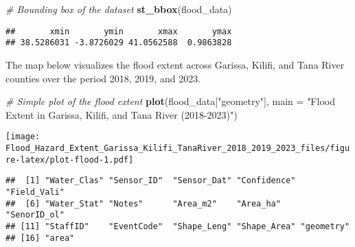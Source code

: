 \documentclass[
]{article}
\newenvironment{Shaded}{\begin{snugshade}}{\end{snugshade}}
\newcommand{\AttributeTok}[1]{\textcolor[rgb]{0.13,0.29,0.53}{#1}}
\newcommand{\CommentTok}[1]{\textcolor[rgb]{0.56,0.35,0.01}{\textit{#1}}}
\newcommand{\FunctionTok}[1]{\textcolor[rgb]{0.13,0.29,0.53}{\textbf{#1}}}
\newcommand{\NormalTok}[1]{#1}
\newcommand{\OtherTok}[1]{\textcolor[rgb]{0.56,0.35,0.01}{#1}}
\newcommand{\SpecialCharTok}[1]{\textcolor[rgb]{0.81,0.36,0.00}{\textbf{#1}}}
\newcommand{\StringTok}[1]{\textcolor[rgb]{0.31,0.60,0.02}{#1}}
\begin{document}
\begin{Shaded}
\begin{Highlighting}[]
\CommentTok{\# Bounding box of the dataset}
\FunctionTok{st\_bbox}\NormalTok{(flood\_data)}
\end{Highlighting}
\end{Shaded}

\begin{verbatim}
##       xmin       ymin       xmax       ymax 
## 38.5286031 -3.8726029 41.0562588  0.9863828
\end{verbatim}

\begin{Shaded}
\begin{Highlighting}[]
\NormalTok{The map below visualizes the flood extent across Garissa, Kilifi, and Tana River counties over the period 2018, 2019, and 2023.}
\end{Highlighting}
\end{Shaded}

\begin{Shaded}
\begin{Highlighting}[]
\CommentTok{\# Simple plot of the flood extent}
\FunctionTok{plot}\NormalTok{(flood\_data[}\StringTok{"geometry"}\NormalTok{], }\AttributeTok{main =} \StringTok{"Flood Extent in Garissa, Kilifi, and Tana River (2018{-}2023)"}\NormalTok{)}
\end{Highlighting}
\end{Shaded}

\texttt{[image: Flood\_Hazard\_Extent\_Garissa\_Kilifi\_TanaRiver\_2018\_2019\_2023\_files/figure-latex/plot-flood-1.pdf]}

\begin{Shaded}
\end{Shaded}

\begin{verbatim}
##  [1] "Water_Clas" "Sensor_ID"  "Sensor_Dat" "Confidence" "Field_Vali"
##  [6] "Water_Stat" "Notes"      "Area_m2"    "Area_ha"    "SenorID_ol"
## [11] "StaffID"    "EventCode"  "Shape_Leng" "Shape_Area" "geometry"  
## [16] "area"
\end{verbatim}
\end{document}

